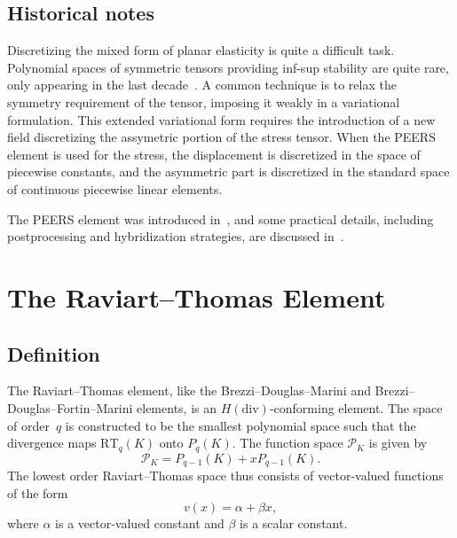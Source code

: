 

\subsection{Historical notes}

Discretizing the mixed form of planar elasticity is quite a difficult
task.  Polynomial spaces of symmetric tensors providing inf-sup
stability are quite rare, only appearing in the last
decade~\cite{ArnoldWinther2002}. A common technique is to relax the
symmetry requirement of the tensor, imposing it weakly in a
variational formulation.  This extended variational form requires the
introduction of a new field discretizing the assymetric portion of the
stress tensor.  When the PEERS element is used for the stress, the
displacement is discretized in the space of piecewise constants, and
the asymmetric part is discretized in the standard space of continuous
piecewise linear elements.

The PEERS element was introduced in~\cite{ArnoldBrezziEtAl1984}, and
some practical details, including postprocessing and hybridization
strategies, are discussed in~\cite{ArnoldBrezzi1985}.

\newpage

\section{The Raviart--Thomas Element}
\label{sec:raviartthomas}

\subsection{Definition}

The Raviart--Thomas element, like the Brezzi--Douglas--Marini and
Brezzi--Douglas--Fortin--Marini elements, is an \( H(\mathrm{div})
\)-conforming element.  The space of order~$q$ is constructed to be
the smallest polynomial space such that the divergence maps \(
\mathrm{RT}_q(K) \) onto \( P_q(K) \). The function space
$\mathcal{P}_K$ is given by
\begin{displaymath}
  \mathcal{P}_K = P_{q-1}(K) + x P_{q-1}(K).
\end{displaymath}
The lowest order Raviart--Thomas space thus consists of vector-valued
functions of the form
\begin{displaymath}
  v(x) = \alpha + \beta x,
\end{displaymath}
where $\alpha$ is a vector-valued constant and $\beta$ is a scalar
constant.

